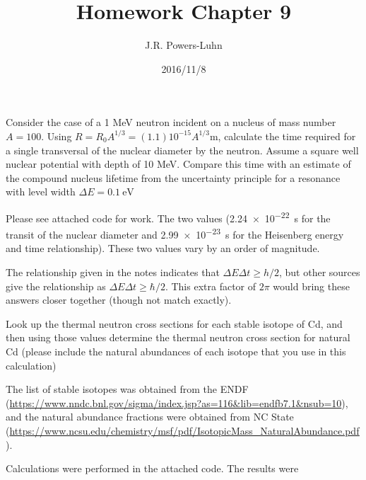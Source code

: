 \documentclass{hw}
\author{J.R. Powers-Luhn}
\date{2016/11/8}
\title{Homework Chapter 9}
\begin{document}
Consider the case of a 1 MeV neutron incident on a nucleus of mass number $A = 100$. Using $R=R_0 A^{1/3}=(1.1)10^{-15} A^{1/3}$m, calculate the time required for a single transversal of the nuclear diameter by the neutron. Assume a square well nuclear potential with depth of 10 MeV. Compare this time with an estimate of the compound nucleus lifetime from the uncertainty principle for a resonance with level width $\Delta E=\SI{0.1}{\electronvolt}$

\solution
Please see attached code for work. The two values (\SI{2.24e-22}{\second} for the transit of the nuclear diameter and \SI{2.99e-23}{\second} for the Heisenberg energy and time relationship). These two values vary by an order of magnitude.

The relationship given in the notes indicates that $\Delta E \Delta t \geq h/2$, but other sources give the relationship as $\Delta E \Delta t \geq \hbar /2$. This extra factor of $2 \pi$ would bring these answers closer together (though not match exactly).

\problem{}
Look up the thermal neutron cross sections for each stable isotope of Cd, and then using those
values determine the thermal neutron cross section for natural Cd (please include the natural
abundances of each isotope that you use in this calculation)

\solution
The list of stable isotopes was obtained from the ENDF (\url{https://www.nndc.bnl.gov/sigma/index.jsp?as=116&lib=endfb7.1&nsub=10}), and the natural abundance fractions were obtained from NC State (\url{https://www.ncsu.edu/chemistry/msf/pdf/IsotopicMass_NaturalAbundance.pdf}).

Calculations were performed in the attached code. The results were
\end{document}
